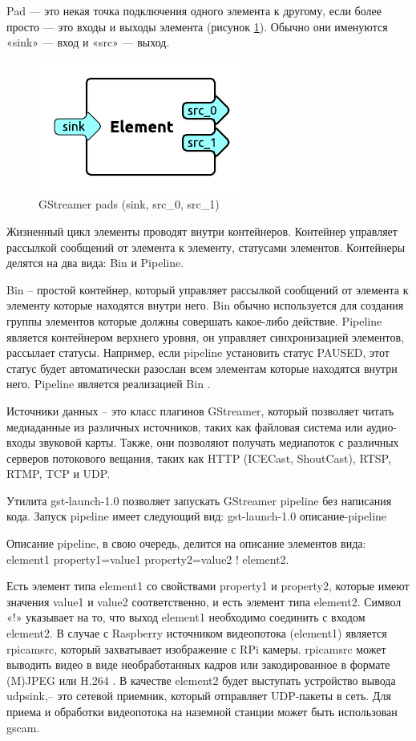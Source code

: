 Pad — это некая точка подключения одного элемента к другому, если более просто — это входы и выходы элемента (рисунок \ref{fig:ris1}). Обычно они именуются «sink» — вход и «src» — выход.
\begin{figure}[H]
	\centering
	\includegraphics[width=0.5\linewidth]{pics/pic1}
	\caption{ GStreamer pads (sink, src\_0, src\_1)
	}
	\label{fig:ris1}
\end{figure}

Жизненный цикл элементы проводят внутри контейнеров. Контейнер управляет рассылкой сообщений от элемента к элементу, статусами элементов. Контейнеры делятся на два вида: Bin и Pipeline.

Bin -- простой контейнер, который управляет рассылкой сообщений от элемента к элементу которые находятся внутри него. Bin обычно используется для создания группы элементов которые должны совершать какое-либо действие. 
Pipeline является контейнером верхнего уровня, он управляет синхронизацией элементов, рассылает статусы. Например, если pipeline установить статус PAUSED, этот статус будет автоматически разослан всем элементам которые находятся внутри него. Pipeline является реализацией Bin \cite{gstreamer}. 

Источники данных -- это класс плагинов GStreamer, который позволяет читать медиаданные из различных источников, таких как файловая система или аудио-входы звуковой карты. Также, они позволяют получать медиапоток с различных серверов потокового вещания, таких как HTTP (ICECast, ShoutCast), RTSP, RTMP, TCP и UDP. 

Утилита gst-launch-1.0 позволяет запускать GStreamer pipeline без написания кода. Запуск pipeline имеет следующий вид:
gst-launch-1.0 описание-pipeline

Описание pipeline, в свою очередь, делится на описание элементов вида:
element1 property1=value1 property2=value2 ! element2.

Есть элемент типа element1 со свойствами property1 и property2, которые имеют значения value1 и value2 соответственно, и есть элемент типа element2. Символ «!» указывает на то, что выход element1 необходимо соединить с входом element2.
В случае с Raspberry источником видеопотока (element1) является rpicamsrc, который захватывает изображение с RPi камеры. rpicamsrc может выводить видео в виде необработанных кадров или закодированное в формате (M)JPEG или H.264 \cite{gstreamer1}. В качестве element2 будет выступать устройство вывода udpsink,-- это сетевой приемник, который отправляет UDP-пакеты в сеть.
Для приема и обработки видеопотока на наземной станции может быть использован gscam.

